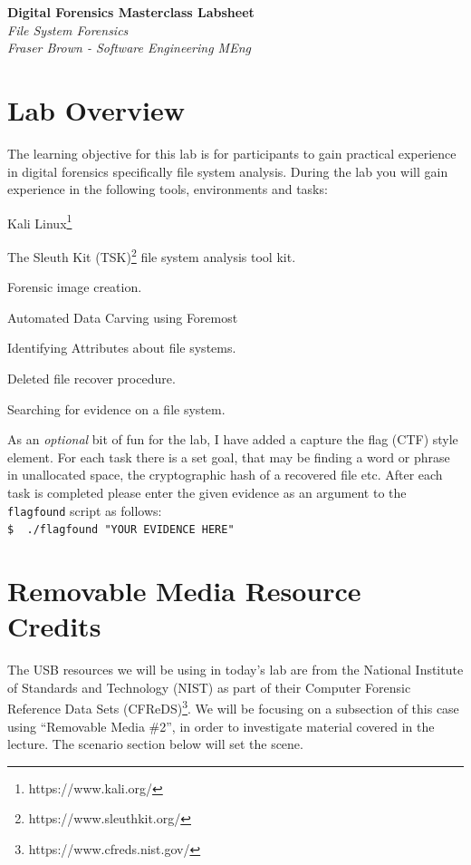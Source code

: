 \documentclass[a4paper,11pt]{article}
\author{Fraser Brown}
\date{\today}
\begin{document}
\begin{titlepage}
   \begin{center}
      \Large\textbf{Digital Forensics Masterclass Labsheet}\\
      \large\textit{File System Forensics}\\
      \large\textit{Fraser Brown - Software Engineering MEng}
   \end{center}
\end{titlepage}

\tableofcontents
\newpage

\section{Lab Overview}
The learning objective for this lab is for participants to gain practical experience in digital forensics specifically file system analysis. During the lab you will gain experience in the following tools, environments and tasks:
\begin{itemize*}
	\item Kali Linux\footnote{https://www.kali.org/}
	\item The Sleuth Kit (TSK)\footnote{https://www.sleuthkit.org/} file system analysis tool kit.
	\item Forensic image creation.
	\item Automated Data Carving using Foremost
	\item Identifying Attributes about file systems. %
	\item Deleted file recover procedure.
	\item Searching for evidence on a file system.
\end{itemize*}

As an \textit{optional} bit of fun for the lab, I have added a capture the flag (CTF) style element. For each task there is a set goal, that may be finding a word or phrase in unallocated space, the cryptographic hash of a recovered file etc. After each task is completed please enter the given evidence as an argument to the \texttt{flagfound} script as follows:\\
\verb|$  ./flagfound "YOUR EVIDENCE HERE"|


\section{Removable Media Resource Credits}
The USB resources we will be using in today's lab are from the National Institute of Standards and Technology (NIST) as part of their Computer Forensic Reference Data Sets (CFReDS)\footnote{https://www.cfreds.nist.gov/}.  We will be focusing on a subsection of this case using ``Removable Media {\#}2'', in order to investigate material covered in the lecture. The scenario section below will set the scene. \\
 
\end{document}
